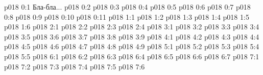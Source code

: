 \author{Божественный Советник}
\vs p018 0:1  Бла-бла...
\vs p018 0:2 
\vs p018 0:3 
\vs p018 0:4 
\vs p018 0:5 
\vs p018 0:6 
\vs p018 0:7 
\vs p018 0:8 
\vs p018 0:9 \pc 
\vs p018 0:10 
\vs p018 0:11 
\vs p018 1:1 
\vs p018 1:2 
\vs p018 1:3 
\vs p018 1:4 \pc 
\vs p018 1:5 
\vs p018 1:6 
\vs p018 2:1 
\vs p018 2:2 
\vs p018 2:3 
\vs p018 2:4 
\vs p018 3:1 
\vs p018 3:2 
\vs p018 3:3 
\vs p018 3:4 \pc 
\vs p018 3:5 \pc 
\vs p018 3:6 
\vs p018 3:7 
\vs p018 3:8 \pc 
\vs p018 3:9 
\vs p018 4:1 
\vs p018 4:2 
\vs p018 4:3 \pc 
\vs p018 4:4 \pc 
\vs p018 4:5 
\vs p018 4:6 
\vs p018 4:7 \pc 
\vs p018 4:8 
\vs p018 4:9 
\vs p018 5:1 
\vs p018 5:2 
\vs p018 5:3 
\vs p018 5:4 
\vs p018 5:5 
\vs p018 6:1 
\vs p018 6:2 
\vs p018 6:3 
\vs p018 6:4 
\vs p018 6:5 \pc 
\vs p018 6:6 
\vs p018 6:7 
\vs p018 7:1 
\vs p018 7:2 
\vs p018 7:3 
\vs p018 7:4 
\vs p018 7:5 
\vsetoff
\vs p018 7:6 
\quizlink
